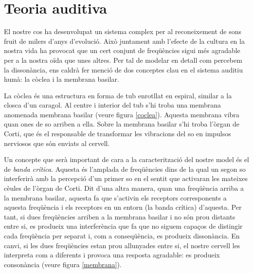 \documentclass{article}
\theoremstyle{math}
\theoremstyle{TheoremNum}
\newcommand{\0}{\ensuremath{\vb{0}}}
\begin{document}
\section{Teoria auditiva}\label{teoria_auditiva}
El nostre cos ha desenvolupat un sistema complex per al reconeixement de sons fruit de milers d'anys d'evolució. Això juntament amb l'efecte de la cultura en la nostra vida ha provocat que un cert conjunt de freqüències sigui més agradable per a la nostra oïda que unes altres. Per tal de modelar en detall com percebem la dissonància, ens caldrà fer menció de dos conceptes clau en el sistema auditiu humà: la còclea i la membrana basilar. \par
La còclea és una estructura en forma de tub enrotllat en espiral, similar a la closca d'un caragol. Al centre i interior del tub s'hi troba una membrana anomenada membrana basilar (veure figura \ref{coclea}). Aquesta membrana vibra quan ones de so arriben a ella. Sobre la membrana basilar s'hi troba l'òrgan de Corti, que és el responsable de transformar les vibracions del so en impulsos nerviosos que són enviats al cervell.\par
Un concepte que serà important de cara a la caracterització del nostre model és el de \textit{banda crítica}. Aquesta és l'amplada de freqüències dins de la qual un segon so interferirà amb la percepció d'un primer so en el sentit que activaran les mateixes cè\lgem ules de l'òrgan de Corti. Dit d'una altra manera, quan una freqüència arriba a la membrana basilar, aquesta fa que s'activin els receptors corresponents a aquesta freqüència i els receptors en un entorn (la banda crítica) d'aquesta. Per tant, si dues freqüències arriben a la membrana basilar i no són prou distants entre si, es produeix una interferència que fa que no siguem capaços de distingir cada freqüència per separat i, com a conseqüència, es produeix dissonància. En canvi, si les dues freqüències estan prou allunyades entre si, el nostre cervell les interpreta com a diferents i provoca una resposta agradable: es produeix consonància (veure figura \ref{membrana}).\par
\end{document}
